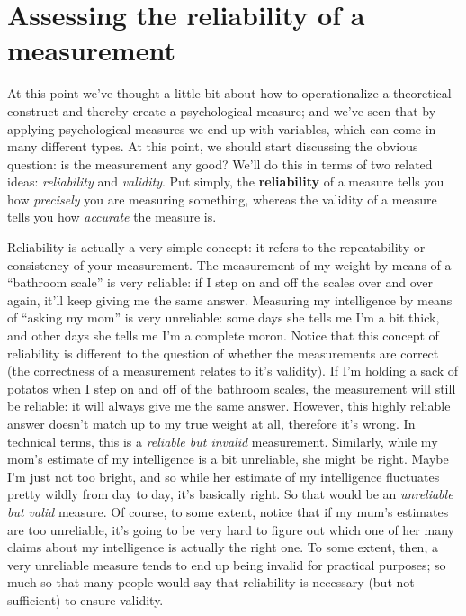 \documentclass[
]{book}
\begin{document}
\hypertarget{assessing-the-reliability-of-a-measurement}{%
\section{Assessing the reliability of a measurement}\label{assessing-the-reliability-of-a-measurement}}

At this point we've thought a little bit about how to operationalize a theoretical construct and thereby create a psychological measure; and we've seen that by applying psychological measures we end up with variables, which can come in many different types. At this point, we should start discussing the obvious question: is the measurement any good? We'll do this in terms of two related ideas: {\emph{reliability}} and {\emph{validity}}. Put simply, the \textbf{reliability} of a measure tells you how {\emph{precisely}} you are measuring something, whereas the validity of a measure tells you how {\emph{accurate}} the measure is.

Reliability is actually a very simple concept: it refers to the repeatability or consistency of your measurement. The measurement of my weight by means of a ``bathroom scale'' is very reliable: if I step on and off the scales over and over again, it'll keep giving me the same answer. Measuring my intelligence by means of ``asking my mom'' is very unreliable: some days she tells me I'm a bit thick, and other days she tells me I'm a complete moron. Notice that this concept of reliability is different to the question of whether the measurements are correct (the correctness of a measurement relates to it's validity). If I'm holding a sack of potatos when I step on and off of the bathroom scales, the measurement will still be reliable: it will always give me the same answer. However, this highly reliable answer doesn't match up to my true weight at all, therefore it's wrong. In technical terms, this is a {\emph{reliable but invalid}} measurement. Similarly, while my mom's estimate of my intelligence is a bit unreliable, she might be right. Maybe I'm just not too bright, and so while her estimate of my intelligence fluctuates pretty wildly from day to day, it's basically right. So that would be an {\emph{unreliable but valid}} measure. Of course, to some extent, notice that if my mum's estimates are too unreliable, it's going to be very hard to figure out which one of her many claims about my intelligence is actually the right one. To some extent, then, a very unreliable measure tends to end up being invalid for practical purposes; so much so that many people would say that reliability is necessary (but not sufficient) to ensure validity.
\end{document}
